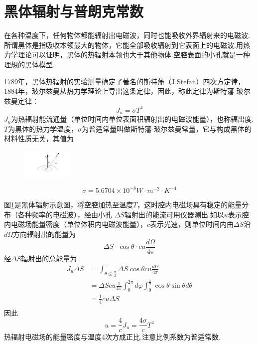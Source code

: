 \section[黑体辐射与普朗克常数]{黑体辐射与普朗克常数}\label{sec:01.01}

在各种温度下，任何物体都能辐射出电磁波，同时也能吸收外界辐射来的电磁波.所谓黑体是指吸收本领最大的物体，它能全部吸收辐射到它表面上的电磁波.用热力学理论可以证明，黑体的热辐射本领也大于其他物体.空腔表面的小孔就是一种理想的黑体模型.

1789年，黑体热辐射的实验测量确定了著名的斯特藩（J.Stefan）四次方定律，1884年，玻尔兹曼从热力学理论上导出这条定律，因此，称此定律为斯特藩-玻尔兹曼定律：
\begin{equation}\label{eq11.01}
	\boxed{J_{u}=\sigma T^{4}}
\end{equation}\eqnormal
$J_{u}$为热辐射能流通量（单位时间内单位表面积辐射出的电磁波能量），也称辐出度.$T$为黑体的热力学温度，$\sigma$为普适常量叫做斯特藩-玻尔兹曼常量，它与构成黑体的材料性质无关，其值为

\begin{figure}
	\centering
	\small
	\includegraphics[width=2.5cm]{QM file/figure/1-1}
	\caption{}\label{fig.1-1}
\end{figure}
\begin{equation*}
	\sigma=5.6704 \times 10^{-8} \si{W\cdot m^{-2} \cdot K^{-4}} 
\end{equation*}\eqnormal

图\ref{fig.1-1}是黑体辐射示意图，将空腔加热至温度$T$，这时腔内电磁场具有稳定的能量分布（各种频率的电磁波），经由小孔 $\Delta S$辐射出的能流可用仪器测出.如以$u$表示腔内电磁场能量密度（单位体积内电磁波能量），$c$表示光速，则单位时间内由$\Delta S$沿$d \Omega$方向辐射出的能量为
\begin{equation*}
	\Delta S\cdot \cos\theta\cdot cu\frac{d\Omega}{4\pi}
\end{equation*}
经$\Delta S$辐射出的总能量为
\begin{equation*}
	\begin{aligned}
		J_{u}\Delta S &=\int_{\theta \leq\frac{\pi}{2}}\Delta S \cos\theta cu \frac{d\Omega}{4\pi} \\
		&=\Delta S cu\frac{1}{4\pi}\int_{0}^{2\pi}d\varphi \int_{0}^{\frac{\pi}{2}}\cos\theta\sin\theta d\theta \\
		&= \frac{1}{4}cu\Delta S \\
	\end{aligned}
\end{equation*}
因此
\eqshort
\begin{equation}\label{eq11.02}
	u=\frac{4}{c}J_{u}=\frac{4\sigma}{c}T^{4}
\end{equation}
热辐射电磁场的能量密度与温度4次方成正比.注意比例系数为普适常数.


